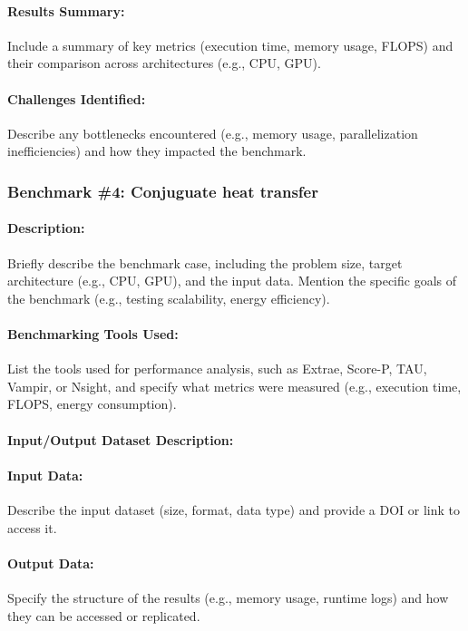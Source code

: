 \paragraph{Results Summary:} Include a summary of key metrics (execution time, memory usage, FLOPS) and their comparison across architectures (e.g., CPU, GPU).

\paragraph{Challenges Identified:} Describe any bottlenecks encountered (e.g., memory usage, parallelization inefficiencies) and how they impacted the benchmark.

\subsubsection{Benchmark \#4: Conjuguate heat transfer}

\paragraph{Description:} Briefly describe the benchmark case, including the problem size, target architecture (e.g., CPU, GPU), and the input data. Mention the specific goals of the benchmark (e.g., testing scalability, energy efficiency).

\paragraph{Benchmarking Tools Used:} List the tools used for performance analysis, such as Extrae, Score-P, TAU, Vampir, or Nsight, and specify what metrics were measured (e.g., execution time, FLOPS, energy consumption).

\paragraph{Input/Output Dataset Description:}
\paragraph{Input Data:} Describe the input dataset (size, format, data type) and provide a DOI or link to access it.

\paragraph{Output Data:} Specify the structure of the results (e.g., memory usage, runtime logs) and how they can be accessed or replicated.

